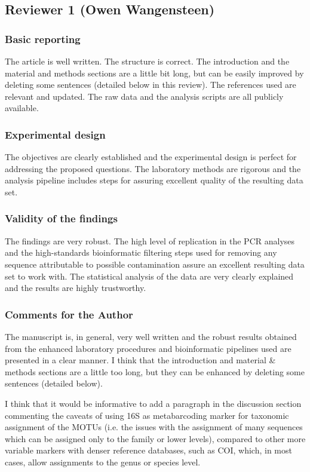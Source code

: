 \documentclass{article}
\begin{document}
\subsection*{Reviewer 1 (Owen Wangensteen)}

\subsubsection*{Basic reporting}
The article is well written. The structure is correct. The introduction and the material and methods sections are a little bit long, but can be easily improved by deleting some sentences (detailed below in this review). The references used are relevant and updated. The raw data and the analysis scripts are all publicly available.

\subsubsection*{Experimental design}
The objectives are clearly established and the experimental design is perfect for addressing the proposed questions. The laboratory methods are rigorous and the analysis pipeline includes steps for assuring excellent quality of the resulting data set.

\subsubsection*{Validity of the findings}
The findings are very robust. The high level of replication in the PCR analyses and the high-standards bioinformatic filtering steps used for removing any sequence attributable to possible contamination assure an excellent resulting data set to work with. The statistical analysis of the data are very clearly explained and the results are highly trustworthy.

\subsubsection*{Comments for the Author}
The manuscript is, in general, very well written and the robust results obtained from the enhanced laboratory procedures and bioinformatic pipelines used are presented in a clear manner. I think that the introduction and material & methods sections are a little too long, but they can be enhanced by deleting some sentences (detailed below).

I think that it would be informative to add a paragraph in the discussion section commenting the caveats of using 16S as metabarcoding marker for taxonomic assignment of the MOTUs (i.e. the issues with the assignment of many sequences which can be assigned only to the family or lower levels), compared to other more variable markers with denser reference databases, such as COI, which, in most cases, allow assignments to the genus or species level.
\end{document}
